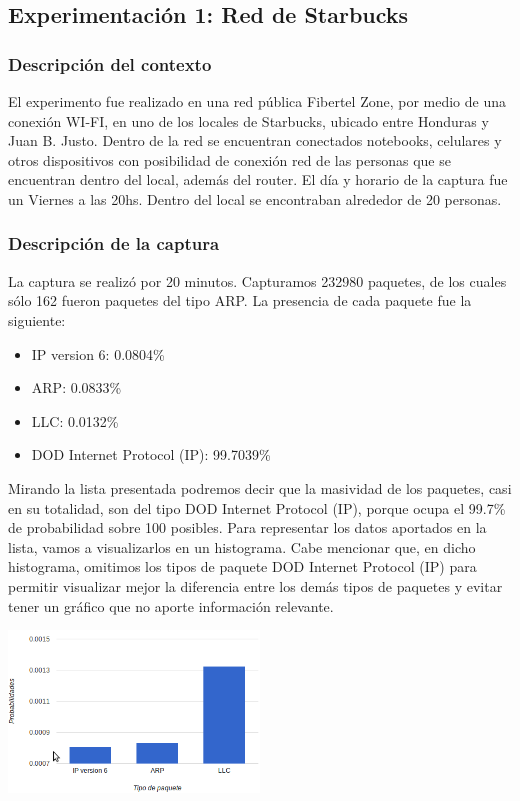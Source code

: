 \subsection{Experimentaci\'on 1: Red de Starbucks}

\subsubsection{Descripci\'on del contexto}
El experimento fue realizado en una red p\'ublica Fibertel Zone, por medio de una conexión WI-FI, en uno de los locales de Starbucks, ubicado entre Honduras y Juan B. Justo. Dentro de la red se encuentran conectados notebooks, celulares y otros dispositivos con posibilidad de conexi\'on red de las personas que se encuentran dentro del local, adem\'as del router. El día y horario de la captura fue un Viernes a las 20hs. Dentro del local se encontraban alrededor de 20 personas.

\subsubsection{Descripci\'on de la captura}
La captura se realiz\'o por 20 minutos. Capturamos 232980 paquetes, de los cuales s\'olo 162 fueron paquetes del tipo ARP. La presencia de cada paquete fue la siguiente:
\begin{itemize}
\item IP version 6: 0.0804\%
\item ARP: 0.0833\%
\item LLC: 0.0132\%
\item DOD Internet Protocol (IP): 99.7039\%
\end{itemize}
Mirando la lista presentada podremos decir que la masividad de los paquetes, casi en su totalidad, son del tipo DOD Internet Protocol (IP), porque ocupa el 99.7\% de probabilidad sobre 100 posibles. Para representar los datos aportados en la lista, vamos a visualizarlos en un histograma. Cabe mencionar que, en dicho histograma, omitimos los tipos de paquete DOD Internet Protocol (IP) para permitir visualizar mejor la diferencia entre los dem\'as tipos de paquetes y evitar tener un gr\'afico que no aporte informaci\'on relevante.

\begin{center}
\includegraphics[width=0.5\textwidth]{exp1-graficos/grafico1exp1.png}
\end{center}

